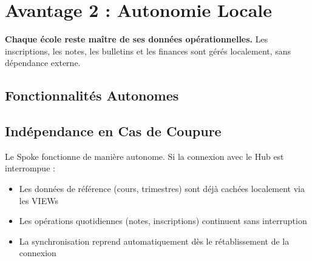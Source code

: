 \documentclass[12pt,a4paper,oneside]{report}
\begin{document}
\chapter{Avantage 2 : Autonomie Locale}

\begin{avantage}
\textbf{Chaque école reste maître de ses données opérationnelles.} Les inscriptions, les notes, les bulletins et les finances sont gérés localement, sans dépendance externe.
\end{avantage}

\section{Fonctionnalités Autonomes}

\begin{center}
\end{center}

\section{Indépendance en Cas de Coupure}

Le Spoke fonctionne de manière autonome. Si la connexion avec le Hub est interrompue :
\begin{itemize}
  \item Les données de référence (cours, trimestres) sont déjà cachées localement via les VIEWs
  \item Les opérations quotidiennes (notes, inscriptions) continuent sans interruption
  \item La synchronisation reprend automatiquement dès le rétablissement de la connexion
\end{itemize}
\end{document}
